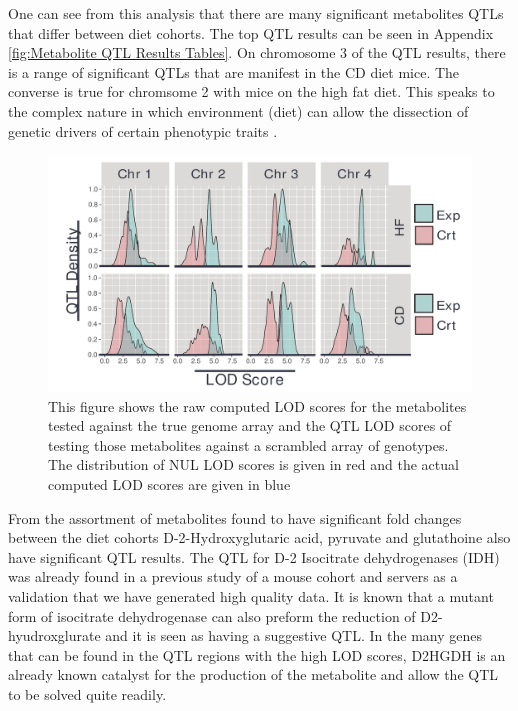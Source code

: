 \documentclass[a4paper]{book}
\begin{document}
	One can see from this analysis that there are many significant metabolites QTLs that differ between diet cohorts. The top QTL results can be seen in Appendix \ref{fig:Metabolite QTL Results Tables}. On chromosome 3 of the QTL results, there is a range of significant QTLs that are manifest in the CD diet mice. The converse is true for chromsome 2 with mice on the high fat diet. This speaks to the complex nature in which environment (diet) can allow the dissection of genetic drivers of certain phenotypic traits \citep{Abiola2003identification}.
	
	\begin{figure}
		\includegraphics[width=\linewidth]{QTL_Results/QTL_Densities.pdf}
		\caption{This figure shows the raw computed LOD scores for the metabolites tested against the true genome array and the QTL LOD scores of testing those metabolites against a scrambled array of genotypes. The distribution of NUL LOD scores is given in red and the actual computed LOD scores are given in blue }
	\label{fig: Distributions of QTL LOD scores for all significant Age and Diet related Metabolites}	
\end{figure}
	
	From the assortment of metabolites found to have significant fold changes between the diet cohorts D-2-Hydroxyglutaric acid, pyruvate and glutathoine also have significant QTL results. The QTL for D-2 Isocitrate dehydrogenases (IDH) was already found in a previous study of a mouse cohort and servers as a validation that we have generated high quality data.  It is known that a mutant form of isocitrate dehydrogenase can also preform the reduction of D2-hyudroxglurate and it is seen as having a suggestive QTL. In the many genes that can be found in the QTL regions with the high LOD scores, D2HGDH is an already known catalyst for the production of the metabolite and allow the QTL to be solved quite readily.
	
\end{document}
